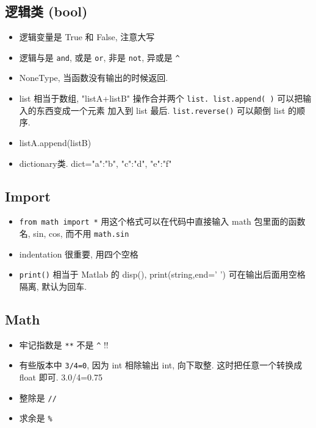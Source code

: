 \subsection{逻辑类 (bool)}
\begin{itemize}
\item 逻辑变量是 True 和 False, 注意大写
\item 逻辑与是 \verb|and|, 或是 \verb|or|, 非是 \verb|not|, 异或是 \verb|^|

\item NoneType, 当函数没有输出的时候返回.
\item list 相当于数组, "listA+listB" 操作合并两个 \verb|list. list.append( )| 可以把输入的东西变成一个元素
    加入到 list 最后.  \verb|list.reverse()| 可以颠倒 list 的顺序.
\item listA.append(listB) 
\item dictionary类.  dict={"a":"b", "c":"d", "e":"f"}
\end{itemize}

\subsection{Import}
\begin{itemize}
\item \verb`from math import *` 用这个格式可以在代码中直接输入 math 包里面的函数名, sin, cos, 而不用 \verb`math.sin`
\item indentation 很重要, 用四个空格
\item \verb`print()` 相当于 Matlab 的 disp(), print(string,end=' ') 可在输出后面用空格隔离, 默认为回车. 
\end{itemize}

\subsection{Math}
\begin{itemize}
\item 牢记指数是 \verb`**` 不是 \verb`^` !!
\item 有些版本中 \verb`3/4=0`, 因为 int 相除输出 int, 向下取整. 这时把任意一个转换成float 即可. 3.0/4=0.75
\item 整除是 \verb`//`
\item 求余是 \verb`%`
\end{itemize}

